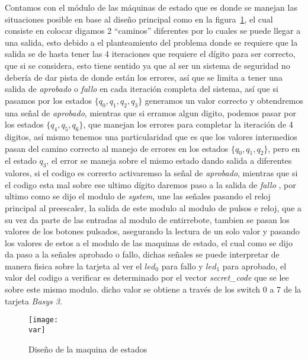 \documentclass[a4paper, 12pt]{article}
\newcommand{\var}{img/jflap.png}
\begin{document}
    Contamos con el módulo de las máquinas de estado que es donde se manejan las situaciones posible en base al diseño principal como en la figura~\ref{fig:estados}, el cual consiste en colocar  digamos 2 “caminos” diferentes por lo cuales se puede llegar a una salida, esto debido a el planteamiento del problema donde se requiere que la salida se de hasta tener las 4 iteraciones que requiere el dígito para ser correcto, que si se considera, esto tiene sentido ya que al ser un sistema de seguridad no debería de dar pista de donde están los errores, así que se limita a tener una salida de \emph{aprobado} o \emph{fallo} en cada iteración completa del sistema, así que si pasamos por los estados $ \{q_0,q_1,q_2,q_3\} $ generamos un valor correcto y obtendremos una señal de \emph{aprobado}, mientras que si erramos algun digito, podemos pasar por los estados $\{q_4,q_5,q_6\}$, que manejan los errores para completar la iteración de 4 digitos, así mismo tenemos una particularidad que es que los valores intermedios pasan del camino correcto al manejo de errores en los estados $\{q_0,q_1,q_2\}$, pero en el estado $q_3$, el error se maneja sobre el mismo estado dando salida a diferentes valores, si el codigo es correcto activaremso la señal de \emph{aprobado}, mientras que si el codigo esta mal sobre ese ultimo dígito daremos paso a  la salida de \emph{fallo} , por ultimo como se dijo el modulo de \emph{system}, une las señales pasando el reloj principal al preescaler, la salida de este modulo al modulo de pulsos e reloj, que a su vez da parte de las entradas al modulo de entirrebote, tambien se pasan los valores de los botones pulsados, asegurando la lectura de un solo valor y pasando los valores de estos a el modulo de las maquinas de estado, el cual como se dijo da paso a la señales aprobado o fallo, dichas señales se puede interpretar de manera fisica sobre la tarjeta al ver el $led_0$ para fallo y $led_1$ para aprobado, el valor del codigo a verificar es determinado por el vector \emph{secret\_code} que se lee sobre este mismo modulo. dicho valor se obtiene a través de los switch 0 a 7 de la tarjeta \emph{Basys 3}.


    \begin{figure}[H]
        \centering
        \texttt{[image: \\var]}
        \caption{Diseño de la maquina de estados}
        \label{fig:estados}
    \end{figure}
\end{document}
